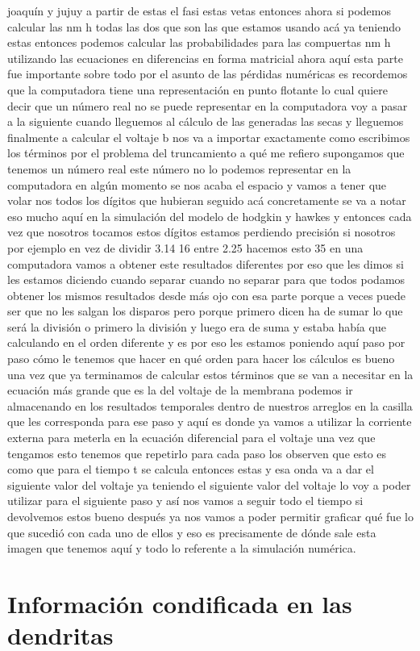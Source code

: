 joaquín y jujuy a partir de estas el fasi estas vetas entonces ahora si podemos calcular las nm h todas las dos que son las que estamos usando acá ya teniendo estas entonces podemos calcular las probabilidades para las compuertas nm h utilizando las ecuaciones en diferencias en forma matricial ahora aquí esta parte fue importante sobre todo por el asunto de las pérdidas numéricas es recordemos que la computadora tiene una representación en punto flotante lo cual quiere decir que un número real no se puede representar en la computadora voy a pasar a la siguiente cuando lleguemos al cálculo de las generadas las secas y lleguemos finalmente a calcular el voltaje b nos va a importar exactamente como escribimos los términos por el problema del truncamiento a qué me refiero supongamos que tenemos un número real este número no lo podemos representar en la computadora en algún momento se nos acaba el espacio y vamos a tener que volar nos todos los dígitos que hubieran seguido acá concretamente se va a notar eso mucho aquí en la simulación del modelo de hodgkin y hawkes y entonces cada vez que nosotros tocamos estos dígitos estamos perdiendo precisión si nosotros por ejemplo en vez de dividir 3.14 16 entre 2.25 hacemos esto 35 en una computadora vamos a obtener este resultados diferentes por eso que les dimos si les estamos diciendo cuando separar cuando no separar para que todos podamos obtener los mismos resultados desde más ojo con esa parte porque a veces puede ser que no les salgan los disparos pero porque primero dicen ha de sumar lo que será la división o primero la división y luego era de suma y estaba había que calculando en el orden diferente y es por eso les estamos poniendo aquí paso por paso cómo le tenemos que hacer en qué orden para hacer los cálculos es bueno una vez que ya terminamos de calcular estos términos que se van a necesitar en la ecuación más grande que es la del voltaje de la membrana podemos ir almacenando en los resultados temporales dentro de nuestros arreglos en la casilla que les corresponda para ese paso y aquí es donde ya vamos a utilizar la corriente externa para meterla en la ecuación diferencial para el voltaje una vez que tengamos esto tenemos que repetirlo para cada paso los observen que esto es como que para el tiempo t se calcula entonces estas y esa onda va a dar el siguiente valor del voltaje ya teniendo el siguiente valor del voltaje lo voy a poder utilizar para el siguiente paso y así nos vamos a seguir todo el tiempo si devolvemos estos bueno después ya nos vamos a poder permitir graficar qué fue lo que sucedió con cada uno de ellos y eso es precisamente de dónde sale esta imagen que tenemos aquí y todo lo referente a la simulación numérica.

\section{Información condificada en las dendritas}

